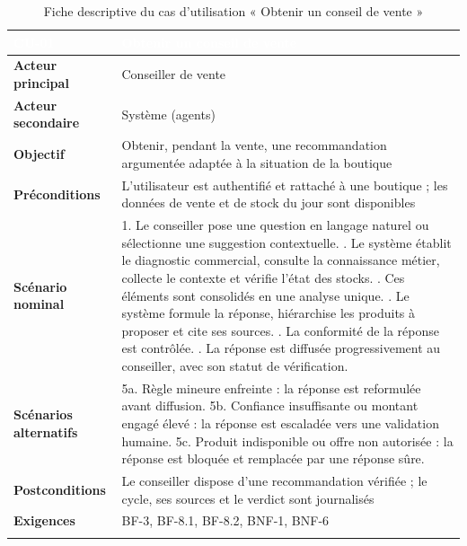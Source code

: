 \begin{longtable}{|P{3.4cm}|P{10.8cm}|}
\hline
{}
\textcolor{white}{\textbf{CU-01}} &
\textcolor{white}{\textbf{Obtenir un conseil de vente}} \\
\hline
\endhead
\hline
\endfoot
\hline
\endlastfoot
\textbf{Acteur principal} & Conseiller de vente \\
\hline
\textbf{Acteur secondaire} & Système (agents) \\
\hline
\textbf{Objectif} & Obtenir, pendant la vente, une recommandation argumentée adaptée à la situation de la boutique \\
\hline
\textbf{Préconditions} & L'utilisateur est authentifié et rattaché à une boutique ; les données de vente et de stock du jour sont disponibles \\
\hline
\textbf{Scénario nominal} &
1. Le conseiller pose une question en langage naturel ou sélectionne une suggestion contextuelle. . Le système établit le diagnostic commercial, consulte la connaissance métier, collecte le contexte et vérifie l'état des stocks. . Ces éléments sont consolidés en une analyse unique. . Le système formule la réponse, hiérarchise les produits à proposer et cite ses sources. . La conformité de la réponse est contrôlée. . La réponse est diffusée progressivement au conseiller, avec son statut de vérification. \\
\hline
\textbf{Scénarios alternatifs} &
5a. Règle mineure enfreinte : la réponse est reformulée avant diffusion. \newline
5b. Confiance insuffisante ou montant engagé élevé : la réponse est escaladée vers une validation humaine. \newline
5c. Produit indisponible ou offre non autorisée : la réponse est bloquée et remplacée par une réponse sûre. \\
\hline
\textbf{Postconditions} & Le conseiller dispose d'une recommandation vérifiée ; le cycle, ses sources et le verdict sont journalisés \\
\hline
\textbf{Exigences} & BF-3, BF-8.1, BF-8.2, BNF-1, BNF-6 \\
\hline
\caption{Fiche descriptive du cas d'utilisation « Obtenir un conseil de vente »}
\label{tab:cu-coach-chap2}
\end{longtable}

